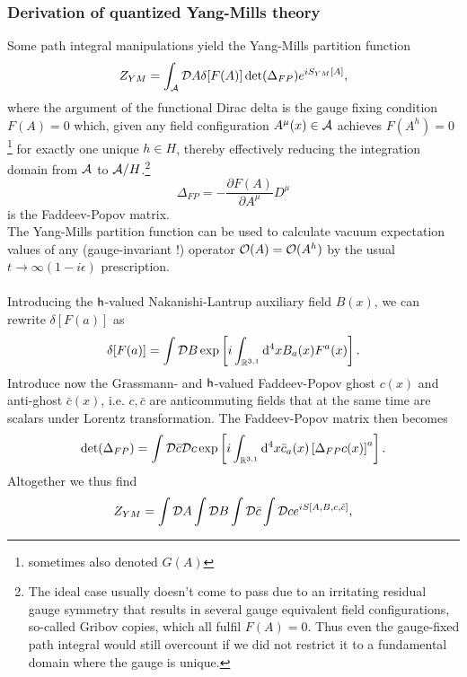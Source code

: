  \subsubsection{Derivation of quantized Yang-Mills theory}
Some path integral manipulations yield the Yang-Mills partition function 
\begin{equation}
	Z_{YM} =\int_{\mathcal{A}} \mathcal{D} A \delta[F(A)] \det(\Delta_{FP}) e^{i S_{YM}[A]},
\end{equation}
where the argument of the functional Dirac delta is the gauge fixing condition $F(A)=0$ which, given any field configuration $A^\mu(x) \in \mathcal{A}$ achieves $F(A^h)=0$ \footnote{sometimes also denoted $G(A)$} for exactly one unique $h\in H$, thereby effectively reducing the integration domain from $\mathcal{A}$ to $\mathcal{A}/H$.\footnote{The ideal case usually doesn't come to pass due to an irritating residual gauge symmetry that results in several gauge equivalent field configurations, so-called Gribov copies, which all fulfil $F(A)=0$. Thus even the gauge-fixed path integral would still overcount if we did not restrict it to a fundamental domain where the gauge is unique.}
\\ \begin{equation}
	\Delta_{FP} = - \frac{\partial F(A)}{\partial A^\mu} D^\mu
\end{equation}
is the Faddeev-Popov matrix. \\
The Yang-Mills partition function can be used to calculate vacuum expectation values of any (gauge-invariant !) operator $\mathcal{O}(A)=\mathcal{O}(A^h)$ by the usual $t \rightarrow \infty (1-i\epsilon)$ prescription.\\
\\
Introducing the $\mathsf{h}$-valued Nakanishi-Lantrup auxiliary field $B(x)$, we can rewrite $\delta[F(a)]$ as
\begin{equation}
\delta [F(a)] = \int \mathcal{D} B \exp\left[i \int_{\mathbb{R}^{3,1}} \mathrm{d}^4 x B_a(x) F^a(x)\right].
\end{equation}
Introduce now the Grassmann- and $\mathsf{h}$-valued Faddeev-Popov ghost $c(x)$ and anti-ghost $\bar{c}(x)$, i.e. $c,\bar{c}$ are anticommuting fields that at the same time are scalars under Lorentz transformation. The Faddeev-Popov matrix then becomes
\begin{equation}
\det(\Delta_{FP}) = \int \mathcal{D} \bar{ c} \mathcal{D} c \exp \left[i \int_{\mathbb{R}^{3,1}} \mathrm{d}^4 x \bar{c}_a(x) \left[\Delta_{FP} c(x)\right]^a\right].
\end{equation}
Altogether we thus find
\begin{equation}
\label{eq:ympartitionfunctionNot}
	Z_{YM} = \int \mathcal{D} A \int \mathcal{D} B \int \mathcal{D} \bar{c} \int \mathcal{D} c e^{i S[A,B,c,\bar{ c}]},
\end{equation}
